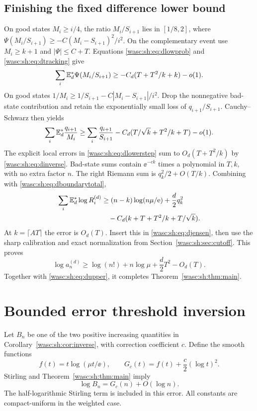 \documentclass[11pt,a4paper]{article}
\theoremstyle{remark}\newtheorem{remark}[theorem]{Remark}
\numberwithin{equation}{section}
\begin{document}
\subsection{Finishing the fixed difference lower bound}
On good states $M_i\ge i/4$, the ratio $M_i/S_{i+1}$ lies in $[1/8,2]$, where
$\Psi(M_i/S_{i+1})\ge-C(M_i-S_{i+1})^2/i^2$.
On the complementary event use $M_i\ge k+1$ and $|\Psi|\le C+T$. Equations \eqref{wasc:sh:eq:dlowprob} and \eqref{wasc:sh:eq:dtracking} give
\[
\sum_i\mathbb E_d^*\Psi(M_i/S_{i+1})\ge-C_d(T+T^2/k+k)-o(1).
\]
On good states $1/M_i\ge1/S_{i+1}-C|M_i-S_{i+1}|/i^2$. Drop the nonnegative bad-state contribution and retain the exponentially small loss of $q_{i+1}/S_{i+1}$. Cauchy--Schwarz then yields
\[
\sum_i\mathbb E_d^*\frac{q_{i+1}}{M_i}
\ge\sum_i\frac{q_{i+1}}{S_{i+1}}
-C_d(T/\sqrt{k}+T^2/k+T)-o(1).
\]
The explicit local errors in \eqref{wasc:sh:eq:dlowerstep} sum to $O_d(T+T^2/k)$ by \eqref{wasc:sh:eq:dinverse}. Bad-state sums contain $\ee^{-ck}$ times a polynomial in $T,k$, with no extra factor $n$. The right Riemann sum is $q_k^2/2+O(T/k)$. Combining with \eqref{wasc:sh:eq:dboundarytotal},
\begin{align}\label{wasc:sh:eq:dlowergain}
\sum_i\mathbb E_d^*\log R_i^{(d)}
&\ge(n-k)\log(n\mu/\mathrm e)+\frac d2q_k^2\notag\\
&\quad-C_d(k+T+T^2/k+T/\sqrt{k}).
\end{align}
At $k=\lceil AT\rceil$ the error is $O_d(T)$. Insert this in \eqref{wasc:sh:eq:djensen}, then use the sharp calibration and exact normalization from Section~\ref{wasc:sh:sec:cutoff}. This proves
\[
\log a_n^{(d)}\ge\log(n!)+n\log\mu+\frac d2T^2-O_d(T).
\]
Together with \eqref{wasc:sh:eq:dupper}, it completes Theorem~\ref{wasc:sh:thm:main}.

\section{Bounded error threshold inversion}\label{wasc:sh:sec:inverse}
Let $B_n$ be one of the two positive increasing quantities in Corollary~\ref{wasc:sh:cor:inverse}, with correction coefficient $c$. Define the smooth functions
\[
f(t)=t\log(\mu t/\ee),\qquad G_c(t)=f(t)+\frac c2(\log t)^2.
\]
Stirling and Theorem~\ref{wasc:sh:thm:main} imply
\begin{equation}\label{wasc:sh:eq:inverseinput}
\log B_n=G_c(n)+O(\log n).
\end{equation}
The half-logarithmic Stirling term is included in this error. All constants are compact-uniform in the weighted case.
\end{document}
